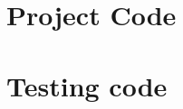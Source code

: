\documentclass[a4paper]{article}
\begin{document}
\printbibliography

\label{last_document_page}



\clearpage

\appendix

\cfoot{\thepage}

\section{Project Code\label{appendix:project-code}}


\section{Testing code\label{appendix:testing-code}}


\end{document}
